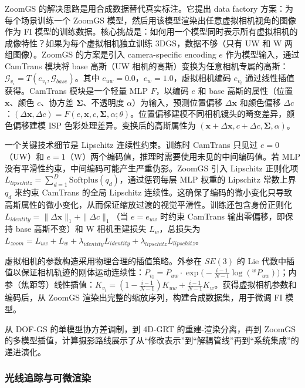 ZoomGS 的解决思路是用合成数据替代真实标注。它提出 data factory 方案：为每个场景训练一个 ZoomGS 模型，然后用该模型渲染出任意虚拟相机视角的图像作为 FI 模型的训练数据。核心挑战是：如何用一个模型同时表示所有虚拟相机的成像特性？如果为每个虚拟相机独立训练 3DGS，数据不够（只有 UW 和 W 两组图像）。ZoomGS 的方案是引入 camera-specific encoding $e$ 作为模型输入，通过 CamTrans 模块将 base 高斯（UW 相机的高斯）变换为任意相机专属的高斯：$\mathcal{G}_{v_i} = T(e_{v_i}, \mathcal{G}_{base})$。其中 $e_{uw}=0.0$，$e_{w}=1.0$，虚拟相机编码 $e_{v_i}$ 通过线性插值获得。CamTrans 模块是一个轻量 MLP $F$，以编码 $e$ 和 base 高斯的属性（位置 $\mathbf{x}$、颜色 $c$、协方差 $\boldsymbol{\Sigma}$、不透明度 $\alpha$）为输入，预测位置偏移 $\Delta\mathbf{x}$ 和颜色偏移 $\Delta c$：$(\Delta\mathbf{x}, \Delta c) = F(e, \mathbf{x}, c, \boldsymbol{\Sigma}, \alpha; \theta)$。位置偏移建模不同相机镜头的畸变差异，颜色偏移建模 ISP 色彩处理差异。变换后的高斯属性为 $(\mathbf{x}+\Delta\mathbf{x}, c+\Delta c, \boldsymbol{\Sigma}, \alpha)$。

一个关键技术细节是 Lipschitz 连续性约束。训练时 CamTrans 只见过 $e=0$（UW）和 $e=1$（W）两个编码值，推理时需要使用未见的中间编码值。若 MLP 没有平滑性约束，中间编码可能产生严重伪影。ZoomGS 引入 Lipschitz 正则化项 $L_{lipschitz} = \sum_{d=1}^D \text{Softplus}(q_d)$，通过惩罚每层 MLP 权重的 Lipschitz 常数上界 $q_d$ 来约束 CamTrans 的全局 Lipschitz 连续性。这确保了编码的微小变化只导致高斯属性的微小变化，从而保证缩放过渡的视觉平滑性。训练还包含身份正则化 $L_{identity} = \|\Delta\mathbf{x}\|_1 + \|\Delta c\|_1$（当 $e=e_{uw}$ 时约束 CamTrans 输出零偏移，即保持 base 高斯不变）和 W 相机重建损失 $L_w$，总损失为 $L_{zoom} = L_{uw} + L_w + \lambda_{identity} L_{identity} + \lambda_{lipschitz} L_{lipschitz}$。

虚拟相机的参数构造采用物理合理的插值策略。外参在 $SE(3)$ 的 Lie 代数中插值以保证相机轨迹的刚体运动连续性：$P_{v_i} = P_{uw} \cdot \exp\!\bigl(-\frac{i-1}{N-1} \log({^wP_{uw}})\bigr)$；内参（焦距等）线性插值：$K_{v_i} = (1-\frac{i-1}{N-1}) K_{uw} + \frac{i-1}{N-1} K_w$。获得虚拟相机参数和编码后，从 ZoomGS 渲染出完整的缩放序列，构建合成数据集，用于微调 FI 模型。

从 DOF-GS 的单模型协方差调制，到 4D-GRT 的重建-渲染分离，再到 ZoomGS 的多模型插值，计算摄影路线展示了从“修改表示”到“解耦管线”再到“系统集成”的递进演化。

\subsubsection{光线追踪与可微渲染}


